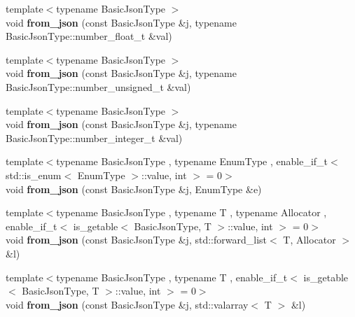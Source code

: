 \begin{DoxyCompactItemize}
{\footnotesize template$<$typename Basic\+Json\+Type $>$ }\\void {\bfseries from\+\_\+json} (const Basic\+Json\+Type \&j, typename Basic\+Json\+Type\+::number\+\_\+float\+\_\+t \&val)
\item 
\mbox{\label{namespacenlohmann_1_1detail_ace4d5680ba413d9fd897ccb5d9c61a1c}} 
{\footnotesize template$<$typename Basic\+Json\+Type $>$ }\\void {\bfseries from\+\_\+json} (const Basic\+Json\+Type \&j, typename Basic\+Json\+Type\+::number\+\_\+unsigned\+\_\+t \&val)
\item 
\mbox{\label{namespacenlohmann_1_1detail_a047d881e611fcac709dc318f730a1732}} 
{\footnotesize template$<$typename Basic\+Json\+Type $>$ }\\void {\bfseries from\+\_\+json} (const Basic\+Json\+Type \&j, typename Basic\+Json\+Type\+::number\+\_\+integer\+\_\+t \&val)
\item 
\mbox{\label{namespacenlohmann_1_1detail_a5440d650150d01e8015133521351b459}} 
{\footnotesize template$<$typename Basic\+Json\+Type , typename Enum\+Type , enable\+\_\+if\+\_\+t$<$ std\+::is\+\_\+enum$<$ Enum\+Type $>$\+::value, int $>$  = 0$>$ }\\void {\bfseries from\+\_\+json} (const Basic\+Json\+Type \&j, Enum\+Type \&e)
\item 
\mbox{\label{namespacenlohmann_1_1detail_a5cfb765aad92795abd7fda29d017272a}} 
{\footnotesize template$<$typename Basic\+Json\+Type , typename T , typename Allocator , enable\+\_\+if\+\_\+t$<$ is\+\_\+getable$<$ Basic\+Json\+Type, T $>$\+::value, int $>$  = 0$>$ }\\void {\bfseries from\+\_\+json} (const Basic\+Json\+Type \&j, std\+::forward\+\_\+list$<$ T, Allocator $>$ \&l)
\item 
\mbox{\label{namespacenlohmann_1_1detail_a3df497b1d3977f071b488ecac1401517}} 
{\footnotesize template$<$typename Basic\+Json\+Type , typename T , enable\+\_\+if\+\_\+t$<$ is\+\_\+getable$<$ Basic\+Json\+Type, T $>$\+::value, int $>$  = 0$>$ }\\void {\bfseries from\+\_\+json} (const Basic\+Json\+Type \&j, std\+::valarray$<$ T $>$ \&l)

\end{DoxyCompactItemize}
